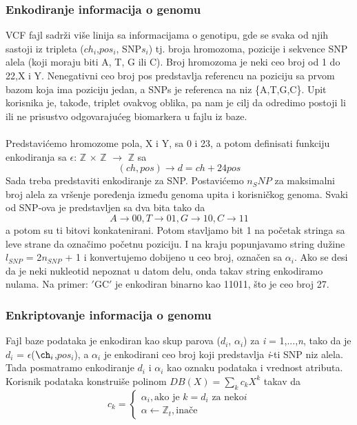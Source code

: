 \documentclass[a4paper]{article}
\begin{document}
\subsubsection{Enkodiranje informacija o genomu}
VCF fajl sadrži više linija sa informacijama o genotipu, gde se svaka od njih sastoji iz tripleta ($ch_i$,$pos_i$, SNP$s_i$) tj. broja hromozoma, pozicije i sekvence SNP alela  (koji moraju biti A, T, G ili C). Broj hromozoma je neki ceo broj od 1 do 22,X i Y. Nenegativni ceo broj pos predstavlja referencu na poziciju sa prvom bazom koja ima poziciju jedan, a SNPs je referenca na niz \{A,T,G,C\}. Upit korisnika je, takođe, triplet ovakvog oblika, pa nam je cilj da odredimo postoji li ili ne prisustvo odgovarajućeg biomarkera u fajlu iz baze. \\\\
Predstavićemo hromozome pola, X i Y, sa 0 i 23, a potom definisati funkciju enkodiranja sa $\epsilon$: $\mathbb{Z}$ $\times$ $\mathbb{Z}$ $\rightarrow$ $\mathbb{Z}$ sa $$(ch, pos) \rightarrow \textit{d} = ch + 24  pos$$
Sada treba predstaviti enkodiranje za SNP. Postavićemo $n_SNP$ za maksimalni broj alela za vršenje poređenja između genoma upita i korisničkog genoma. Svaki od SNP-ova je predstavljen sa dva bita tako da 
$$A \rightarrow 00, T \rightarrow 01, G \rightarrow 10, C \rightarrow 11$$
a potom su ti bitovi konkatenirani. Potom stavljamo bit 1 na početak stringa sa leve strane da označimo početnu poziciju. I na kraju popunjavamo string dužine $\textit{l}_{SNP}$ = 2$n_{SNP}$ + 1 i konvertujemo dobijeno u ceo broj, označen sa $\alpha_i$. Ako se desi da je neki nukleotid nepoznat u datom delu, onda takav string enkodiramo nulama. Na primer: $'$GC$'$ je enkodiran binarno kao 11011, što je ceo broj 27.
\subsubsection{Enkriptovanje informacija o genomu}
Fajl baze podataka je enkodiran kao skup parova ($d_i$, $\alpha_i$) za \textit{i} = 1,...,\textit{n}, tako da je $d_i$ = $\epsilon$($\ch_i$,$pos_i$), a $\alpha_i$ je enkodirani ceo broj koji predstavlja \textit{i}-ti SNP niz alela. Tada posmatramo enkodiranje $d_i$ i $\alpha_i$ kao oznaku podataka i vrednost atributa. Korisnik podataka konstruiše polinom $DB(X) = \sum_k c_k X^k$ takav da 
	$$c_k =\left\{
				\begin{array}{lr}
					\alpha_i, \text{ako je $k = d_i$ za neko} \textit{i}\\
					\alpha \leftarrow \mathbb{Z}_t ,\text{inače}
				\end{array}
			\right.$$
\end{document}

